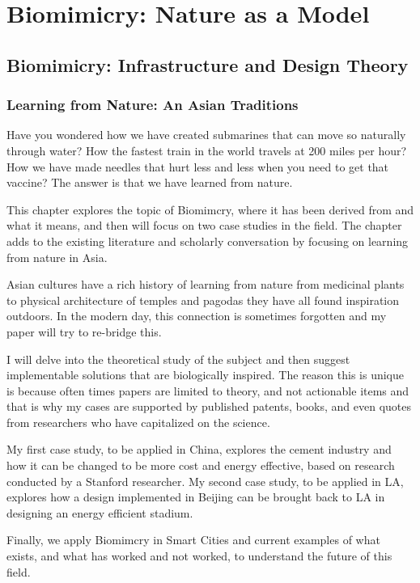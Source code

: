 \chapter{Biomimicry: Nature as a Model}\label{ch:biomimicry}

\section{Biomimicry: Infrastructure and Design Theory}

\subsection{Learning from Nature: An Asian Traditions}

Have you wondered how we have created submarines that can move so naturally through water? How the fastest train in the world travels at 200 miles per hour? How we have made needles that hurt less and less when you need to get that vaccine? The answer is that we have learned from nature.

This chapter explores the topic of Biomimcry, where it has been derived from and what it means, and then will focus on two case studies in the field. The chapter adds to the existing literature and scholarly conversation by focusing on learning from nature in Asia. 

Asian cultures have a rich history of learning from nature from medicinal plants to physical architecture of temples and pagodas they have all found inspiration outdoors. In the modern day, this connection is sometimes forgotten and my paper will try to re-bridge this. 

I will delve into the theoretical study of the subject and then suggest implementable solutions that are biologically inspired. The reason this is unique is because often times papers are limited to theory, and not actionable items and that is why my cases are supported by published patents, books, and even quotes from researchers who have capitalized on the science. 

My first case study, to be applied in China, explores the cement industry and how it can be changed to be more cost and energy effective, based on research conducted by a Stanford researcher. My second case study, to be applied in LA, explores how a design implemented in Beijing can be brought back to LA in designing an energy efficient stadium. 

Finally, we apply Biomimcry in Smart Cities and current examples of what exists, and what has worked and not worked, to understand the future of this field.

